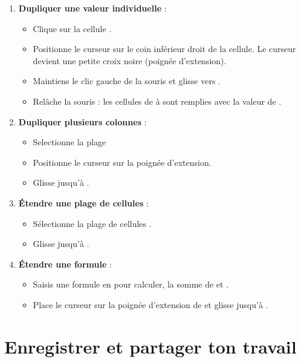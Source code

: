 \begin{enumerate}
    \item \textbf{Dupliquer une valeur individuelle} :
    \begin{itemize}
        \item Clique sur la cellule \cell[C20].
        \item Positionne le curseur sur le coin inférieur droit de la cellule. Le curseur devient une petite croix noire (poignée d'extension).
        \item Maintiens le clic gauche de la souris et glisse vers \cell[C29].
        \item Relâche la souris : les cellules de \cell[C21] à \cell[C29] sont remplies avec la valeur de \cell[C20].
    \end{itemize}

    \item \textbf{Dupliquer plusieurs colonnes} :
    \begin{itemize}
        \item Selectionne la plage \cell[D20:E20]
        \item Positionne le curseur sur la poignée d'extension.
        \item Glisse jusqu'à \cell[E29].
    \end{itemize}

    \item \textbf{Étendre une plage de cellules} :
    \begin{itemize}
        \item Sélectionne la plage de cellules \cell[F20:F21].
        \item Glisse jusqu'à \cell[F29].
    \end{itemize}

    \item \textbf{Étendre une formule} :
    \begin{itemize}
        \item Saisis une formule en \cell[H20] pour calculer, la somme de \cell[I20] et \cell[J20].
        \item Place le curseur sur la poignée d'extension de \cell[H20] et glisse jusqu'à \cell[H29].
    \end{itemize}
\end{enumerate}

\section{Enregistrer et partager ton travail}

